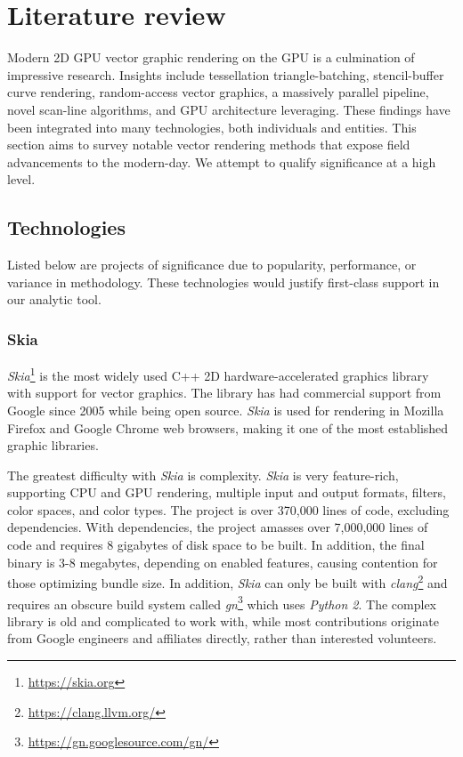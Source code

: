 \section{Literature review}\label{sec:literature_review}

Modern 2D GPU vector graphic rendering on the GPU is a culmination of impressive research. Insights include tessellation triangle-batching\cite{Silva18}, stencil-buffer curve rendering\cite{Loop05}, random-access vector graphics\cite{Nehab08}, a massively parallel pipeline\cite{Ganacim14}, novel scan-line algorithms\cite{Li16}, and GPU architecture leveraging\cite{Levien20}. These findings have been integrated into many technologies, both individuals and entities. This section aims to survey notable vector rendering methods that expose field advancements to the modern-day. We attempt to qualify significance at a high level.

\subsection{Technologies}

Listed below are projects of significance due to popularity, performance, or variance in methodology. These technologies would justify first-class support in our analytic tool.

\subsubsection{Skia}\label{sec:skia}
\textit{Skia}\footnote{\href{https://skia.org}{https://skia.org}} is the most widely used C++ 2D hardware-accelerated graphics library with support for vector graphics. The library has had commercial support from Google since 2005 while being open source\cite{Skia}. \textit{Skia} is used for rendering in Mozilla Firefox and Google Chrome web browsers, making it one of the most established graphic libraries.

The greatest difficulty with \textit{Skia} is complexity. \textit{Skia} is very feature-rich, supporting CPU and GPU rendering, multiple input and output formats, filters, color spaces, and color types. The project is over 370,000 lines of code, excluding dependencies. With dependencies, the project amasses over 7,000,000 lines of code and requires 8 gigabytes of disk space to be built. In addition, the final binary is 3-8 megabytes, depending on enabled features, causing contention for those optimizing bundle size. In addition, \textit{Skia} can only be built with \textit{clang}\footnote{\href{https://clang.llvm.org/}{https://clang.llvm.org/}} and requires an obscure build system called \textit{gn}\footnote{\href{https://gn.googlesource.com/gn/}{https://gn.googlesource.com/gn/}} which uses \textit{Python 2}. The complex library is old and complicated to work with, while most contributions originate from Google engineers and affiliates directly, rather than interested volunteers.\medskip

